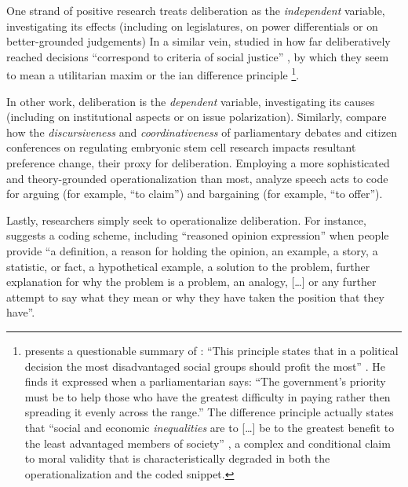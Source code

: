 One strand of positive research treats deliberation as the \emph{independent} variable, investigating its effects (including \citealt{Bachtiger2005} on legislatures, \citealt{Hibbings2002} on power differentials or \citealt{Jackman2008} on better-grounded judgements) %
In a similar vein, \cite{Steiner2004} studied in how far deliberatively reached decisions ``correspond to criteria of social justice'' \cite[13]{Steiner2012}, by which they seem to mean a utilitarian maxim \citep{Bentham1789} or the \citeauthor{Rawls-1971}ian difference principle \cite[95]{Steiner2012}
\footnote{
	\citeauthor{Steiner2012} presents a questionable summary of \citeauthor{Rawls-1971}: 
	``This principle states that in a political decision the most disadvantaged social groups should profit the most'' \citep[95]{Steiner2012}.
	He finds it expressed when a parliamentarian says: 
	``The government's priority must be to help those who have the greatest difficulty in paying rather then spreading it evenly across the range.''
	The difference principle actually states that ``social and economic \emph{inequalities} are to [\ldots] be to the greatest benefit to the least advantaged members of society'' \cite[266]{Rawls-1971}, a complex and conditional claim to moral validity that is characteristically degraded in both the operationalization and the coded snippet.
}.

In other work, deliberation is the \emph{dependent} variable, investigating its causes (including \citealt{Steiner2004} on institutional aspects or \citealt[13]{Steiner2012} on issue polarization).
Similarly, \cite{Landwehr2010} compare how the \emph{discursiveness} and \emph{coordinativeness} of parliamentary debates and citizen conferences on regulating embryonic stem cell research impacts resultant preference change, their proxy for deliberation.
Employing a more sophisticated and theory-grounded operationalization than most, \citet[377]{Landwehr2010} analyze speech acts to code for arguing (for example, ``to claim'') and bargaining (for example, ``to offer''). %

Lastly, researchers simply seek to operationalize deliberation. 
For instance, \cite{Stromer-Galley2007} suggests a coding scheme, including ``reasoned opinion expression'' when people provide ``a definition, a reason for holding the opinion, an example, a story, a statistic, or fact, a hypothetical example, a solution to the problem, further explanation for why the problem is a problem, an analogy, [\ldots] or any further attempt to say what they mean or why they have taken the position that they have''.

